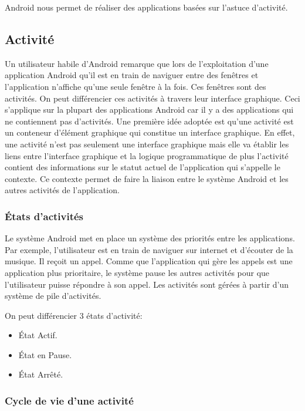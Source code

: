 Android nous permet de réaliser des applications basées sur l'astuce d'activité.

\subsection{Activité}

Un utilisateur habile d'Android remarque que lors de l'exploitation d'une
application Android qu'il est en train de naviguer entre des fenêtres et
l'application n'affiche qu'une seule fenêtre à la fois. Ces fenêtres sont des
activités. On peut différencier ces activités à travers leur interface
graphique. Ceci s'applique sur la plupart des applications Android car il y a
des applications qui ne contiennent pas d'activités. Une première idée adoptée
est qu'une activité est un conteneur d'élément graphique qui constitue un
interface graphique. En effet, une activité n'est pas seulement une interface
graphique mais elle va établir les liens entre l'interface graphique et la
logique programmatique de plus l'activité contient des informations sur le
statut actuel de l'application qui s'appelle le contexte. Ce contexte permet de
faire la liaison entre le système Android et les autres activités de
l'application.

\subsubsection{États d'activités}

Le système Android met en place un système des priorités entre les
applications.  Par exemple, l'utilisateur est en train de naviguer sur internet
et d'écouter de la musique. Il reçoit un appel. Comme que l'application qui
gère les appels est une application plus prioritaire, le système pause les
autres activités pour que l'utilisateur puisse répondre à son appel. Les
activités sont gérées à partir d'un système de pile d'activités.

On peut différencier 3 états d'activité:

\begin{itemize}
    \item État Actif.
    \item État en Pause.
    \item État Arrêté.
\end{itemize}

\subsubsection{Cycle de vie d'une activité}

